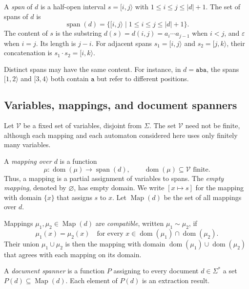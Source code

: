 \begin{definition}[Span]\label{def:span}
A \emph{span} of $d$ is a half-open interval $s=[i,j\rangle$ with
$1\leq i\leq j\leq |d|+1$. The set of spans of $d$ is
\[
  \operatorname{span}(d)
  =\{[i,j\rangle\mid 1\leq i\leq j\leq |d|+1\}.
\]
The content of $s$ is the substring
$d(s)=d(i,j)=a_i\cdots a_{j-1}$ when $i<j$, and
$\varepsilon$ when $i=j$. Its length is $j-i$.
For adjacent spans $s_1=[i,j\rangle$ and $s_2=[j,k\rangle$, their
concatenation 
is $s_1\cdot s_2=[i,k\rangle$.
\end{definition}

Distinct spans may have the same content. For instance, in
$d=\mathtt{aba}$, the spans $[1,2\rangle$ and $[3,4\rangle$ both
contain $\mathtt{a}$ but refer to different positions.

\subsection{Variables, mappings, and document spanners}\label{subsec:mappings}

Let $\mathcal V$ be a fixed set of variables, disjoint from $\Sigma$.
The set $\mathcal V$ need not be finite, although each mapping and each
automaton considered here uses only finitely many variables.

\begin{definition}[Mapping]\label{def:mapping}
A \emph{mapping over $d$} is a function
\[
  \mu:\operatorname{dom}(\mu)\longrightarrow\operatorname{span}(d),
  \qquad \operatorname{dom}(\mu)\subseteq\mathcal V\text{ finite}.
\]
Thus, a mapping is a partial assignment of variables to spans.
The \emph{empty mapping}, denoted by $\varnothing$, has empty domain.
We write $[x\mapsto s]$ for the mapping with domain $\{x\}$ that assigns
$s$ to $x$. Let $\operatorname{Map}(d)$ be the set of all mappings over $d$.
\end{definition}

\begin{definition}[Compatibility]\label{def:compatible-mappings}
Mappings $\mu_1,\mu_2\in\operatorname{Map}(d)$ are \emph{compatible},
written $\mu_1\sim\mu_2$, if
\[
  \mu_1(x)=\mu_2(x)
  \quad\text{for every }x\in
  \operatorname{dom}(\mu_1)\cap\operatorname{dom}(\mu_2).
\]
Their union $\mu_1\cup\mu_2$ is then the mapping with domain
$\operatorname{dom}(\mu_1)\cup\operatorname{dom}(\mu_2)$ that agrees
with each mapping on its domain.
\end{definition}

\begin{definition}\label{def:spanner}
A \emph{document spanner} is a function $P$ assigning to every document
$d\in\Sigma^*$ a set $P(d)\subseteq\operatorname{Map}(d)$.
Each element of $P(d)$ is an extraction result.
\end{definition}

